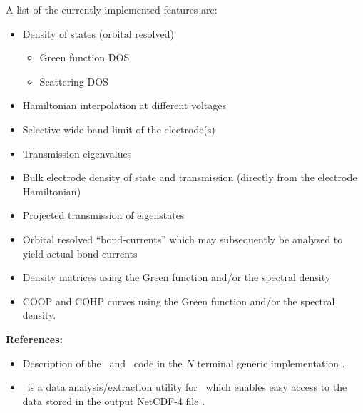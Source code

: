 A list of the currently implemented features are:
\begin{itemize}

  \item Density of states (orbital resolved)
  \begin{itemize}
    \item Green function DOS
    \item Scattering DOS
  \end{itemize}

  \item Hamiltonian interpolation at different voltages

  \item Selective wide-band limit of the electrode(s)

  \item Transmission eigenvalues

  \item Bulk electrode density of state and transmission (directly
  from the electrode Hamiltonian)

  \item Projected transmission of eigenstates

  \item Orbital resolved ``bond-currents'' which may subsequently be
  analyzed to yield actual bond-currents

  \item Density matrices using the Green function and/or the
  spectral density
  
  \item COOP and COHP curves using the Green function and/or the
  spectral density.
  
\end{itemize}


\vspace{0.5cm}
{\large \textbf{References:} }

\begin{itemize}

  \item%
  Description of the \tbtrans\ and \tsiesta\ code in the $N$ terminal
  generic implementation \cite{Papior2017}.

  \item%
  \sisl\ is a data analysis/extraction utility for \tbtrans\ which
  enables easy access to the data stored in the output NetCDF-4 file
  \cite{sisl}.

\end{itemize}



